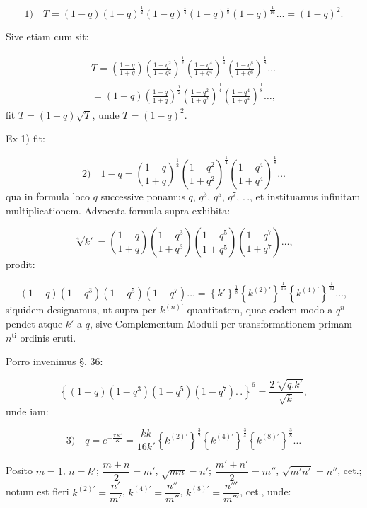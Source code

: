 \documentclass{article}
\begin{document}
\[
\text{1)}\quad T=(1-q)(1-q)^{\frac{1}{2}}(1-q)^{\frac{1}{4}}(1-q)^{\frac{1}{8}}(1-q)^{\frac{1}{16}}\ldots=(1-q)^{2}.
\]

Sive etiam cum sit:

\[
\begin{gathered}
T=\left(\frac{1-q}{1+q}\right)\left(\frac{1-q^{2}}{1+q^{2}}\right)^{\frac{1}{2}}\left(\frac{1-q^{4}}{1+q^{4}}\right)^{\frac{1}{4}}\left(\frac{1-q^{8}}{1+q^{8}}\right)^{\frac{1}{8}}\ldots\\[1.5ex]
=(1-q)\left(\frac{1-q}{1+q}\right)^{\frac{1}{2}}\left(\frac{1-q^{2}}{1+q^{2}}\right)^{\frac{1}{4}}\left(\frac{1-q^{4}}{1+q^{4}}\right)^{\frac{1}{8}}\ldots,
\end{gathered}
\]
fit $T=(1-q)\sqrt{T}$, unde $T=(1-q)^{2}$.

Ex 1) fit:

\[
\text{2)}\quad 1-q=\left(\frac{1-q}{1+q}\right)^{\frac{1}{2}}\left(\frac{1-q^{2}}{1+q^{2}}\right)^{\frac{1}{4}}\left(\frac{1-q^{4}}{1+q^{4}}\right)^{\frac{1}{8}}\ldots
\]
qua in formula loco $q$ successive ponamus $q$, $q^{3}$, $q^{5}$, $q^{7}$, $.\,.$, et instituamus infinitam multiplicationem. Advocata formula supra exhibita:

\[
\sqrt[4]{k'}=\left(\frac{1-q}{1+q}\right)\left(\frac{1-q^{3}}{1+q^{3}}\right)\left(\frac{1-q^{5}}{1+q^{5}}\right)\left(\frac{1-q^{7}}{1+q^{7}}\right)\ldots,
\]
prodit:

\[
(1-q)(1-q^{3})(1-q^{5})(1-q^{7})\ldots=\left\{k'\right\}^{\frac{1}{8}}\left\{k^{(2)\prime}\right\}^{\frac{1}{16}}\left\{k^{(4)\prime}\right\}^{\frac{1}{32}}\ldots,
\]
siquidem designamus, ut supra per $k^{(n)\prime}$ quantitatem, quae eodem modo a $q^{n}$ pendet atque $k'$ a $q$, sive Complementum Moduli per transformationem primam $n^{\mathrm{ti}}$ ordinis eruti.

Porro invenimus §. 36:

\[
\left\{(1-q)(1-q^{3})(1-q^{5})(1-q^{7}).\,.\right\}^{6}=\frac{2\sqrt[4]{q.k'}}{\sqrt{k}},
\]
unde iam:

\[
\text{3)}\quad q=e^{-\frac{\pi K'}{K}}=\frac{kk}{16k'}\left\{k^{(2)\prime}\right\}^{\frac{3}{2}}\left\{k^{(4)\prime}\right\}^{\frac{3}{4}}\left\{k^{(8)\prime}\right\}^{\frac{3}{8}}\ldots
\]

Posito $m=1$, $n=k'$; $\dfrac{m+n}{2}=m'$, $\sqrt{mn}=n'$; $\dfrac{m'+n'}{2}=m''$, $\sqrt{m'n'}=n''$, cet.; notum est fieri $k^{(2)\prime}=\dfrac{n'}{m'}$, $k^{(4)\prime}=\dfrac{n''}{m''}$, $k^{(8)\prime}=\dfrac{n'''}{m'''}$, cet., unde:
\end{document}
